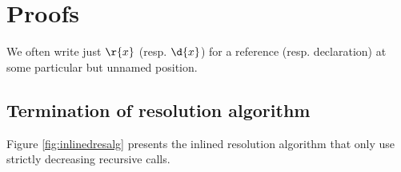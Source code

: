 \section{Proofs}
\label{app:proofs}

We often write just $\r{x}$ (resp. $\d{x}$) for a reference (resp. declaration) at some particular but unnamed position.

\renewcommand{\labelenumi}{\tab $\roman{enumi})$ }

\subsection{Termination of resolution algorithm}\label{subsection:inlinedresalg}

Figure \ref{fig:inlinedresalg} presents the inlined resolution algorithm that only use strictly 
decreasing recursive calls.

